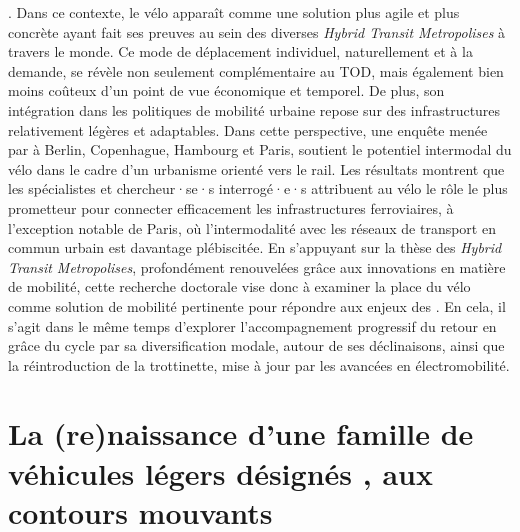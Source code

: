 \begin{refsegment}
{}. Dans ce contexte, le vélo apparaît comme une solution plus agile et plus concrète ayant fait ses preuves au sein des diverses \textsl{Hybrid Transit Metropolises} à travers le monde. Ce mode de déplacement individuel, naturellement  et à la demande, se révèle non seulement complémentaire au \acrshort{TOD}, mais également bien moins coûteux d'un point de vue économique et temporel. De plus, son intégration dans les politiques de mobilité urbaine repose sur des infrastructures relativement légères et adaptables. Dans cette perspective, une enquête menée par \textcolor{blue}{\textcite[119]{goletz_intermodality_2020}} à Berlin, Copenhague, Hambourg et Paris, soutient le potentiel intermodal du vélo dans le cadre d’un urbanisme orienté vers le rail. Les résultats montrent que les spécialistes et chercheur·se·s interrogé·e·s attribuent au vélo le rôle le plus prometteur pour connecter efficacement les infrastructures ferroviaires, à l’exception notable de Paris, où l’intermodalité avec les réseaux de transport en commun urbain est davantage plébiscitée. En s’appuyant sur la thèse des \textsl{Hybrid Transit Metropolises}, profondément renouvelées grâce aux innovations en matière de mobilité, cette recherche doctorale vise donc à examiner la place du vélo comme solution de mobilité pertinente pour répondre aux enjeux des . En cela, il s'agit dans le même temps d'explorer l’accompagnement progressif du retour en grâce du cycle par sa diversification modale, autour de ses déclinaisons, ainsi que la réintroduction de la trottinette, mise à jour par les avancées en électromobilité.%

    \newpage
\section{La (re)naissance d’une famille de véhicules légers désignés , aux contours mouvants
    \label{chap1:mobilite-individuelle-legere}
    }


\end{refsegment}
